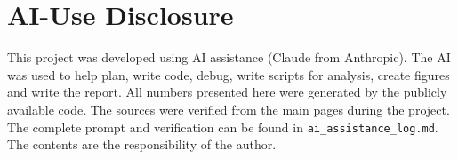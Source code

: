 \section*{AI-Use Disclosure}
This project was developed using AI assistance (Claude from Anthropic). The AI was used to help plan, write code, debug, write scripts for analysis, create figures and write the report.
All numbers presented here were generated by the publicly available code. The sources were verified from the main pages during the project. The complete prompt and verification can be found in \texttt{ai\_assistance\_log.md}. The contents are the responsibility of the author.